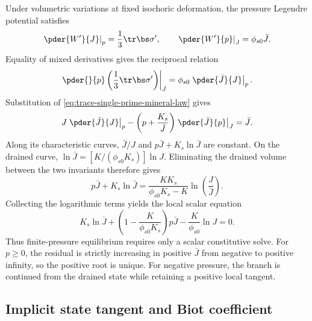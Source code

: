 Under volumetric variations at fixed isochoric deformation, the pressure
Legendre potential satisfies
\begin{equation}
 \left.\pder{W^{\prime}}{J}\right|_p
 =\frac13\tr\bs\sigma^{\prime},
 \qquad
 \left.\pder{W^{\prime}}{p}\right|_J=\phi_{s0}\bar J.
 \label{eq:trace-legendre-conjugacies}
\end{equation}
Equality of mixed derivatives gives the reciprocal relation
\begin{equation}
 \left.\pder{}{p}\left(\frac13\tr\bs\sigma^{\prime}\right)\right|_J
 =\phi_{s0}\left.\pder{\bar J}{J}\right|_p.
 \label{eq:trace-stress-mineral-reciprocity}
\end{equation}
Substitution of \eqref{eq:trace-single-prime-mineral-law} gives
\begin{equation}
 J\left.\pder{\bar J}{J}\right|_p
 -\left(p+\frac{K_s}{\bar J}\right)
 \left.\pder{\bar J}{p}\right|_J=\bar J.
 \label{eq:trace-compatible-mineral-pde}
\end{equation}
Along its characteristic curves, \(\bar J/J\) and
\(p\bar J+K_s\ln\bar J\) are constant.  On the drained curve,
\(\ln\bar J=[K/(\phi_{s0}K_s)]\ln J\).  Eliminating the drained volume
between the two invariants therefore gives
\begin{equation}
 p\bar J+K_s\ln\bar J
 =\frac{KK_s}{\phi_{s0}K_s-K}\ln\left(\frac{J}{\bar J}\right).
 \label{eq:trace-characteristic-invariant-relation}
\end{equation}
Collecting the logarithmic terms yields the local scalar equation
\begin{equation}
 \boxed{
 K_s\ln\bar J
 +\left(1-\frac{K}{\phi_{s0}K_s}\right)p\bar J
 -\frac{K}{\phi_{s0}}\ln J=0.}
 \label{eq:trace-implicit-mineral-volume}
\end{equation}
Thus finite-pressure equilibrium requires only a scalar constitutive solve.
For \(p\geq0\), the residual is strictly increasing in positive \(\bar J\)
from negative to positive infinity, so the positive root is unique.  For
negative pressure, the branch is continued from the drained state while
retaining a positive local tangent.

\subsection{Implicit state tangent and Biot coefficient}

